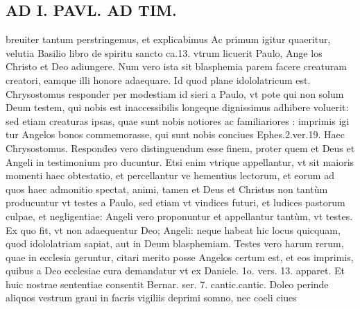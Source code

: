 \documentclass{article}
\begin{document}
\begin{pages}
\section*{AD I. PAVL. AD TIM. }
\marginpar{[ p.B ]}\pstart breuiter tantum perstringemus, et explicabimus Ac primum igitur quaeritur, velutia Basilio libro de spiritu sancto ca.13. vtrum licuerit Paulo, Ange los Christo et Deo adiungere. Num vero ista sit blasphemia parem facere creaturam creatori, eamque  illi honore adaequare. Id quod plane idololatricum est. Chrysostomus responder per modestiam id sieri a Paulo, vt pote qui non solum Deum testem, qui nobis est inaccessibilis longeque dignissimus adhibere voluerit: sed etiam creaturas ipsas, quae sunt nobis notiores ac familiariores : imprimis igi tur Angelos bonos commemorasse, qui sunt nobis conciues Ephes.2.ver.19. Haec Chrysostomus. Respondeo vero distinguendum esse finem, proter quem et Deus et Angeli in testimonium pro ducuntur. Etsi enim vtrique appellantur, vt sit maioris momenti haec obtestatio, et percellantur ve hementius lectorum, et eorum ad quos haec admonitio spectat, animi, tamen et Deus et Christus non tantùm producuntur vt testes a Paulo, sed etiam vt vindices futuri, et ludices pastorum culpae, et negligentiae: Angeli vero proponuntur et appellantur tantùm, vt testes. Ex quo fit, vt non adaequentur Deo; Angeli: neque habeat hic locus quicquam, quod idololatriam sapiat, aut in Deum blasphemiam.  \pend\pstart Testes vero harum rerum, quae in ecclesia geruntur, citari merito posse Angelos certum est, et eos imprimis, quibus a Deo ecclesiae cura demandatur vt ex Daniele. 1o. vers. 13. apparet. Et huic nostrae sententiae consentit Bernar. ser. 7. cantic.cantic. Doleo perinde aliquos vestrum graui in facris vigiliis deprimi somno, nec coeli ciues  \pend

\end{pages}
\end{document}
